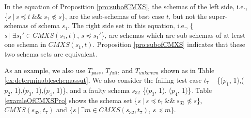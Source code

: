
In the equation of Proposition \ref{pro:subofCMXS}, the schemas of the left side, i.e., \{$s\ |\ s \preceq t\ \&\&\ s_{1} \npreceq s$\}, are the sub-schemas of test case $t$, but not the super-schemas of  schema $s_{1}$.  The right side set in this equation, i.e., \{$ s\ |\ \exists s_{1}' \in CMXS(s_{1}, t)$, $s \preceq s_{1}'$\}, are schemas which are sub-schemas of at least one schema in $CMXS(s_{1}, t)$. Proposition \ref{pro:subofCMXS} indicates that these two schema sets are equivalent.

As an example, we also use $T_{pass}$, $T_{fail}$, and $T_{unkonwn}$ shown as in Table \ref{ex:determinableschemassut}.  We also consider the failing test case $t_{7}$ -- \{($p_{1}$, 1),($p_{2}$, 1),($p_{3}$, 1),($p_{4}$, 1)\}, and a faulty schema $s_{32}$  \{($p_{3}$, 1), ($p_{4}$, 1)\}.
Table \ref{examleOfCMXSPro} shows the schema set  \{$s\ |\ s \preceq t_{7}\ \&\&\ s_{32} \npreceq s$\}, $CMXS(s_{32}, t_{7})$ and \{$ s\ |\ \exists m \in CMXS(s_{32}, t_{7})$, $s \preceq m$\}.

